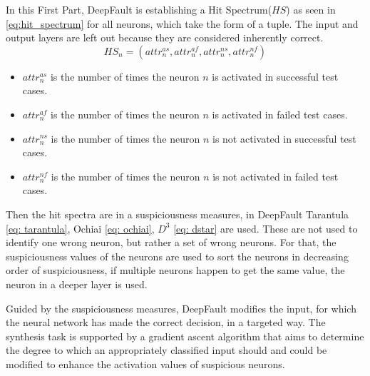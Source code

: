 In this First Part, DeepFault is establishing a Hit Spectrum($HS$) as seen in \ref{eq:hit_spectrum} for all neurons, which take the form of a tuple.
The input and output layers are left out because they are considered inherently correct.
\begin{equation}
    HS_n = (attr_n^{as}, attr_n^{af}, attr_n^{ns}, attr_n^{nf})\label{eq:hit_spectrum}
\end{equation}
\begin{itemize}
    \item $attr^{as}_n$ is the number of times the neuron $n$ is activated in successful test cases.
    \item $attr^{af}_n$ is the number of times the neuron $n$ is activated in failed test cases.
    \item $attr^{ns}_n$ is the number of times the neuron $n$ is not activated in successful test cases.
    \item $attr^{nf}_n$ is the number of times the neuron $n$ is not activated in failed test cases.
\end{itemize}
Then the hit spectra are in a suspiciousness measures, in DeepFault Tarantula \ref{eq: tarantula}, Ochiai \ref{eq: ochiai}, $D^3$ \ref{eq: dstar} are used.
These are not used to identify one wrong neuron, but rather a set of wrong neurons.
For that, the suspiciousness values of the neurons are used to sort the neurons in decreasing order of suspiciousness, if multiple neurons happen to get the same value, the neuron in a deeper layer is used.

Guided by the suspiciousness measures, DeepFault modifies the input, for which the neural network has made the correct decision, in a targeted way.
The synthesis task is supported by a gradient ascent algorithm that aims to determine the degree to which an appropriately classified input should and could be modified to enhance the activation values of suspicious neurons.